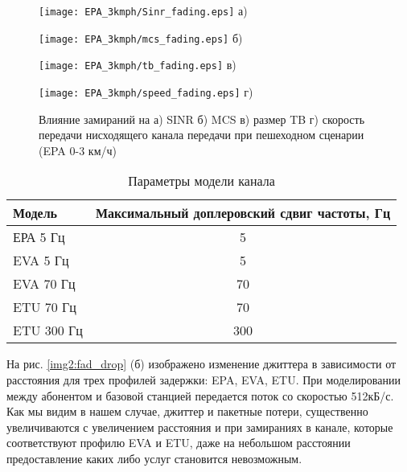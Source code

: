 \begin{figure} [!h]
\begin{minipage}[h]{0.47\linewidth}
\center
\texttt{[image: EPA\_3kmph/Sinr\_fading.eps]} а) \\
\end{minipage}
\hfill
\begin{minipage}[h]{0.47\linewidth}
\center
\texttt{[image: EPA\_3kmph/mcs\_fading.eps]} б) \\
\end{minipage}
\vfill
\begin{minipage}[h]{0.47\linewidth}
\center
\texttt{[image: EPA\_3kmph/tb\_fading.eps]} в) \\
\end{minipage}
\hfill
\begin{minipage}[h]{0.47\linewidth}
\center
\texttt{[image: EPA\_3kmph/speed\_fading.eps]} г) \\
\end{minipage}
\caption{Влияние замираний на а) SINR б) MCS в) размер TB г) скорость передачи нисходящего канала передачи при пешеходном сценарии (EPA 0-3 км/ч)}
\label{img:EPA_3kmph}
\end{figure}


\begin{table} [!htb]
  \centering
\parbox{15cm}{\caption{Параметры модели канала}\label{model_chanel}}
\begin{tabular}{|l|c|}
    \hline
    \hline
    Модель     & Максимальный доплеровский сдвиг частоты, Гц \\ \hline \hline
    ЕРА 5 Гц   & 5                                       \\ \hline
    EVA 5 Гц   & 5                                       \\ \hline
    EVA 70 Гц  & 70                                      \\ \hline
    ETU 70 Гц  & 70                                      \\ \hline
    ETU 300 Гц & 300                                     \\ \hline
    \end{tabular}
\end{table}

На рис. \ref{img2:fad_drop} (б) изображено изменение джиттера в зависимости от расстояния для трех профилей задержки: EPA, EVA, ETU. 
При моделировании между абонентом и базовой станцией передается поток со скоростью 512кБ/с. 
Как мы видим в нашем случае, джиттер и пакетные потери, существенно увеличиваются с увеличением расстояния и при замираниях в канале, которые соответствуют профилю EVA и ETU, 
даже на небольшом расстоянии предоставление каких либо услуг становится невозможным.


